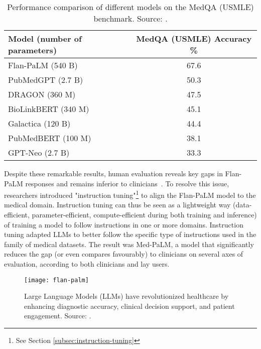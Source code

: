 \begin{table}[!h]
	\centering
	\begin{tabular}{@{}lc@{}}
		\toprule
		Model (number of parameters) & MedQA (USMLE) Accuracy \% \\
		\midrule
		Flan-PaLM (540 B)            & 67.6                      \\
		PubMedGPT (2.7 B)            & 50.3                      \\
		DRAGON (360 M)               & 47.5                      \\
		BioLinkBERT (340 M)          & 45.1                      \\
		Galactica (120 B)            & 44.4                      \\
		PubMedBERT (100 M)           & 38.1                      \\
		GPT-Neo (2.7 B)              & 33.3                      \\
		\bottomrule
	\end{tabular}
	\caption{Performance comparison of different models on the MedQA (USMLE) benchmark. Source: \protect\textcite{singhal2022large}.}
	\label{tab:medqa_performance}
\end{table}

Despite these remarkable results, human evaluation reveals key gaps in Flan-PaLM responses and remains inferior to clinicians~\cite{singhal2022large}.
To resolve this issue, researchers introduced "instruction tuning"\footnote{See Section \ref{subsec:instruction-tuning}} to align the Flan-PaLM model to the medical domain.
Instruction tuning can thus be seen as a lightweight way (data-efficient, parameter-efficient, compute-efficient during both training and inference) of training a model to follow instructions in one or more domains.
Instruction tuning adapted LLMs to better follow the specific type of instructions used in the family of medical datasets.
The result was Med-PaLM, a model that significantly reduces the gap (or even compares favourably) to clinicians on several axes of evaluation, according to both clinicians and lay users.

\begin{figure}[h!]
	\centering
	\texttt{[image: flan-palm]}
	\caption{Large Language Models (LLMs) have revolutionized healthcare by enhancing diagnostic accuracy, clinical decision support, and patient engagement. Source: \protect\textcite{singhal2022large}.}
	\label{fig:llm-healthcare}
\end{figure}

